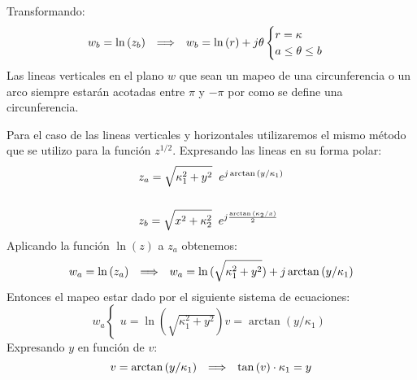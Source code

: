 Transformando:
\begin{equation}
    w_b=\ln{(z_b)}\hspace{0.25cm} \Longrightarrow \hspace{0.25cm} w_b=\ln{(r)}+j\theta\begin{cases}
        r=\kappa\\
        a\leq\theta\leq b
    \end{cases}
\end{equation}
Las lineas verticales en el plano $w$ que sean un mapeo de una circunferencia o un arco siempre estarán acotadas entre $\pi$ y $-\pi$ por como se define una circunferencia.
\begin{figure}[H]
    \centering
    \begin{minipage}{0.49\textwidth}
        \centering
        
    \end{minipage}
    \begin{minipage}{0.49\textwidth}
        \centering
        
    \end{minipage}
    \caption{}
    \label{fig:LnF2}
\end{figure}
Para el caso de las lineas verticales y horizontales utilizaremos el mismo método que se utilizo para la función $z^{1/2}$.
Expresando las lineas en su forma polar:
\begin{equation}
    \begin{aligned}
        &z_a=\sqrt{\kappa_1^2+y^2}\hspace{0.2cm}e^{j\arctan{(y/\kappa_1)}}\\
        &\\
        &z_b=\sqrt{x^2+\kappa_2^2}\hspace{0.2cm}e^{j\frac{\arctan{(\kappa_2/x)}}{2}}
    \end{aligned}
\end{equation}
Aplicando la función $\ln{(z)}$ a $z_a$ obtenemos:
\begin{equation}
    w_a=\ln{(z_a)}\hspace{0.25cm} \Longrightarrow \hspace{0.25cm} w_a=\ln{(\sqrt{\kappa_1^2+y^2})}+j\arctan{(y/\kappa_1)}
\end{equation}
Entonces el mapeo estar dado por el siguiente sistema de ecuaciones:
\begin{equation}
    w_a\begin{cases}
        u=\ln{(\sqrt{\kappa_1^2+y^2})}
        v=\arctan{(y/\kappa_1)}
    \end{cases}
\end{equation}
Expresando $y$ en función de $v$:
\begin{equation}
    v=\arctan{(y/\kappa_1)}\hspace{0.25cm} \Longrightarrow \hspace{0.25cm}\tan{(v)}\cdot\kappa_1=y
\end{equation}
